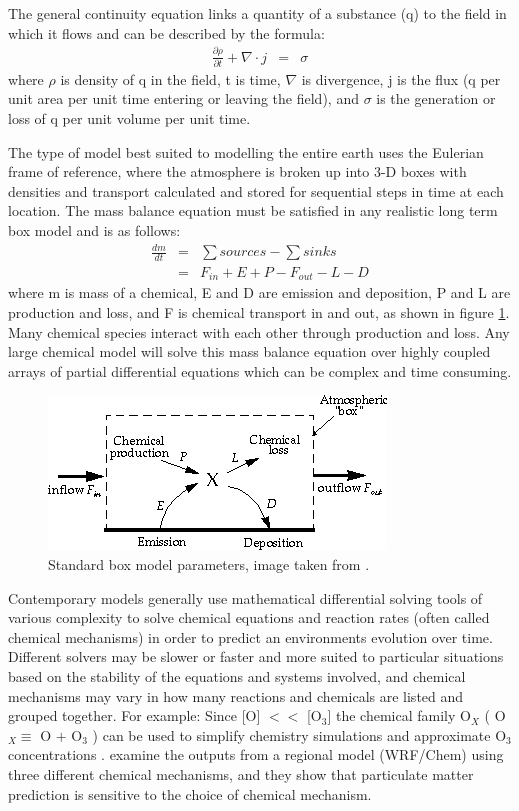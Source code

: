   The general continuity equation links a quantity of a substance (q) to the field in which it flows and can be described by the formula:
  \begin{align*}
    \frac{\partial \rho}{\partial t} + \nabla \cdot j &=& \sigma 
  \end{align*}
  where $\rho$ is density of q in the field, t is time, $\nabla$ is divergence, j is the flux (q per unit area per unit time entering or leaving the field), and $\sigma$ is the generation or loss of q per unit volume per unit time.
  
  
  The type of model best suited to modelling the entire earth uses the Eulerian frame of reference, where the atmosphere is broken up into 3-D boxes with densities and transport calculated and stored for sequential steps in time at each location.
  The mass balance equation must be satisfied in any realistic long term box model and is as follows: 
  \begin{align*}
    \frac{dm}{dt} &=& \sum{sources}-\sum{sinks} \\
    &=& F_{in} + E + P - F_{out} - L - D 
  \end{align*}
  where m is mass of a chemical, E and D are emission and deposition, P and L are production and loss, and F is chemical transport in and out, as shown in figure \ref{LR:Models:fig_boxmodel}.
  Many chemical species interact with each other through production and loss. 
  Any large chemical model will solve this mass balance equation over highly coupled arrays of partial differential equations which can be complex and time consuming.
  
  \begin{figure}
    \includegraphics{Figures/boxmodel.png}
    \caption{ %
      Standard box model parameters, image taken from \cite{Jacob_1999_book}. }
    \label{LR:Models:fig_boxmodel}
  \end{figure}
  
  
  Contemporary models generally use mathematical differential solving tools of various complexity to solve chemical equations and reaction rates (often called chemical mechanisms) in order to predict an environments evolution over time.
  Different solvers may be slower or faster and more suited to particular situations based on the stability of the equations and systems involved, and chemical mechanisms may vary in how many reactions and chemicals are listed and grouped together.
  For example: Since [O] $<<$ [O$_3$] the chemical family O$_X$ (  O$_X \equiv $ O $+$ O$_3$ ) can be used to simplify chemistry simulations and approximate O$_3$ concentrations \citep[][Chapter 3]{BrasseurJacob2017}.
  \cite{Zhang2012} examine the outputs from a regional model (WRF/Chem) using three different chemical mechanisms, and they show that particulate matter prediction is sensitive to the choice of chemical mechanism. 
  
